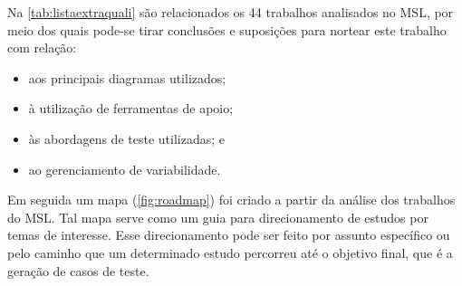Na \ref{tab:listaextraquali} são relacionados os 44 trabalhos analisados no MSL, por meio dos quais pode-se tirar conclusões e suposições para nortear este trabalho com relação:

\begin{itemize}
	\item aos principais diagramas utilizados;
	\item à utilização de ferramentas de apoio;
	\item às abordagens de teste utilizadas; e
	\item ao gerenciamento de variabilidade.
\end{itemize}

 Em seguida um mapa (\ref{fig:roadmap}) foi criado a partir da análise dos trabalhos do MSL. Tal mapa serve como um guia para direcionamento de estudos por temas de interesse. Esse direcionamento pode ser feito por assunto específico ou pelo caminho que um determinado estudo percorreu até o objetivo final, que é a geração de casos de teste.




